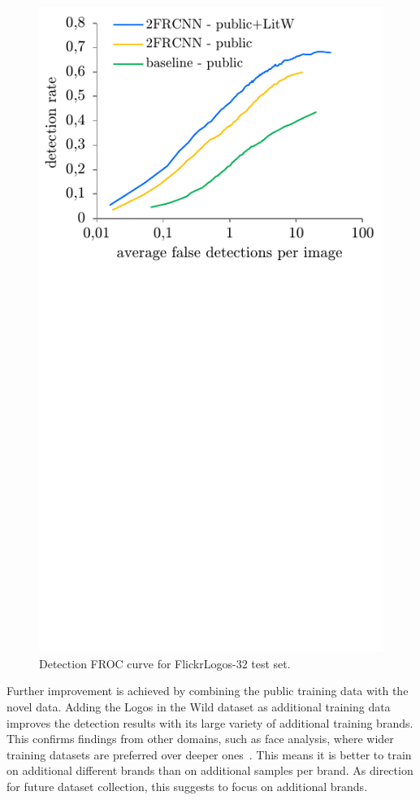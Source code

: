 \documentclass[a4paper,twoside]{article}
\begin{document}
\begin{figure}%
\centering%
\includegraphics[width=\linewidth, trim=0cm 9cm 0cm 0cm, clip]{img/detectionFroc.pdf}%
\caption{Detection FROC curve for FlickrLogos-32 test set.}%
\label{fig:detectionFroc}
\end{figure}%
%

Further improvement is achieved by combining the public training data with the novel data.
Adding the Logos in the Wild dataset as additional training data improves the detection results with its large variety of additional training brands. 
This confirms findings from other domains, such as face analysis, where wider training datasets are preferred over deeper ones~\cite{bansal2017}. This means it is better to train on additional different brands than on additional samples per brand.
As direction for future dataset collection, this suggests to focus on additional brands.
\end{document}
